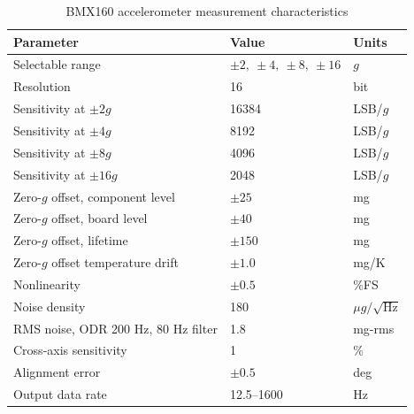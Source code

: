 \documentclass[conference,onecolumn,draftclsnofoot]{IEEEtran}
\begin{document}
\begin{table}[H]
\centering
\caption{BMX160 accelerometer measurement characteristics}
\label{tab:bmx160_accel_specs}
\begin{tabular}{lll}
\hline
Parameter & Value & Units \\
\hline
Selectable range & $\pm 2,\ \pm 4,\ \pm 8,\ \pm 16$ & $g$ \\
Resolution & 16 & bit \\
Sensitivity at $\pm 2g$ & 16384 & LSB/$g$ \\
Sensitivity at $\pm 4g$ & 8192 & LSB/$g$ \\
Sensitivity at $\pm 8g$ & 4096 & LSB/$g$ \\
Sensitivity at $\pm 16g$ & 2048 & LSB/$g$ \\
Zero-$g$ offset, component level & $\pm 25$ & mg \\
Zero-$g$ offset, board level & $\pm 40$ & mg \\
Zero-$g$ offset, lifetime & $\pm 150$ & mg \\
Zero-$g$ offset temperature drift & $\pm 1.0$ & mg/K \\
Nonlinearity & $\pm 0.5$ & \%FS \\
Noise density & 180 & $\mu g/\sqrt{\mathrm{Hz}}$ \\
RMS noise, ODR 200 Hz, 80 Hz filter & 1.8 & mg-rms \\
Cross-axis sensitivity & 1 & \% \\
Alignment error & $\pm 0.5$ & deg \\
Output data rate & 12.5--1600 & Hz \\
\hline
\end{tabular}
\end{table}
\end{document}
